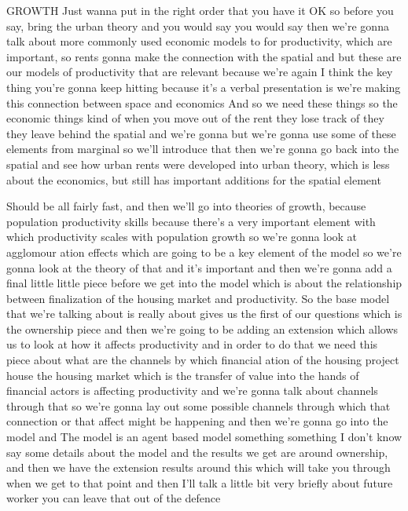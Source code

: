 \documentclass[]{article}
\begin{document}
GROWTH
Just wanna put in the right order that you have it OK so before you say, bring the urban theory and you would say you would say then we’re gonna talk about more commonly used economic models to for productivity, which are important, so rents gonna make the connection with the spatial and but these are our models of productivity that are relevant because we’re again I think the key thing you’re gonna keep hitting because it’s a verbal presentation is we’re making this connection between space and economics And so we need these things so the economic things kind of when you move out of the rent they lose track of they they leave behind the spatial and we’re gonna but we’re gonna use some of these elements from marginal so we’ll introduce that then we’re gonna go back into the spatial and see how urban rents were developed into urban theory, which is less about the economics, but still has important additions for the spatial element

Should be all fairly fast, and then we’ll go into theories of growth, because population productivity skills because there’s a very important element with which productivity scales with population growth so we’re gonna look at agglomour ation effects which are going to be a key element of the model so we’re gonna look at the theory of that and it’s important and then we’re gonna add a final little little piece before we get into the model which is about the relationship between finalization of the housing market and productivity. So the base model that we’re talking about is really about gives us the first of our questions which is the ownership piece and then we’re going to be adding an extension which allows us to look at how it affects productivity and in order to do that we need this piece about what are the channels by which financial ation of the housing project house the housing market which is the transfer of value into the hands of financial actors is affecting productivity and we’re gonna talk about channels through that so we’re gonna lay out some possible channels through which that connection or that affect might be happening and then we’re gonna go into the model and The model is an agent based model something something I don’t know say some details about the model and the results we get are around ownership, and then we have the extension results around this which will take you through when we get to that point and then I’ll talk a little bit very briefly about future worker you can leave that out of the defence
\end{document}
